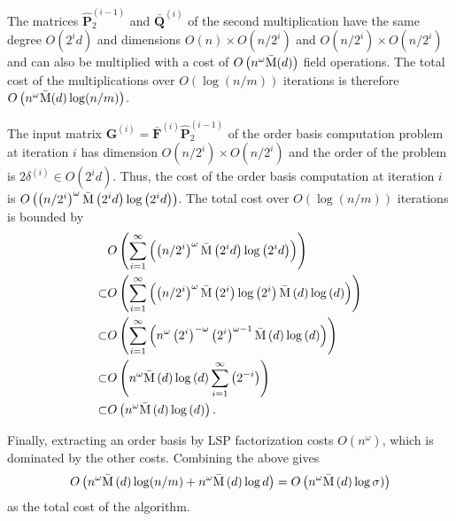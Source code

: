 \begin{pf}
The matrices $\hat{\mathbf{P}}_{2}^{\left(i-1\right)}$ and $\bar{\mathbf{Q}}^{\left(i\right)}$
of the second multiplication have the same degree $O(2^{i}d)$ and
dimensions $O\left(n\right)\times O(n/2^{i})$ and $O(n/2^{i})\times O(n/2^{i})$
and can also be multiplied with a cost of $O\left(n^{\omega}\bar{\M}(d)\right)$
field operations. The total cost of the multiplications over $O(\log\left(n/m\right))$
iterations is therefore $O\left(n^{\omega}\bar{\M}(d)\log(n/m)\right)$.

The input matrix $\mathbf{G}^{\left(i\right)}=\bar{\mathbf{F}}^{\left(i\right)}\hat{\mathbf{P}}_{2}^{\left(i-1\right)}$
of the order basis computation problem at iteration $i$ has dimension
$O(n/2^{i})\times O(n/2^{i})$ and the order of the problem is $2\delta^{\left(i\right)}\in O(2^{i}d)$.
Thus, the cost of the order basis computation at iteration $i$ is
$O\left(\left(n/2^{i}\right)^{\omega}\bar{\M}\left(2^{i}d\right)\log\left(2^{i}d\right)\right)$.
The total cost over $O(\log\left(n/m\right))$ iterations is bounded
by \begin{align*}
 & O\left(\sum_{i=1}^{\infty}\left(\left(n/2^{i}\right)^{\omega}\bar{\M}\left(2^{i}d\right)\log\left(2^{i}d\right)\right)\right)\\
\subset & O\left(\sum_{i=1}^{\infty}\left(\left(n/2^{i}\right)^{\omega}\bar{\M}\left(2^{i}\right)\log\left(2^{i}\right)\bar{\M}\left(d\right)\log\left(d\right)\right)\right)\\
\subset & O\left(\sum_{i=1}^{\infty}\left(n^{\omega}\left(2^{i}\right)^{-\omega}\left(2^{i}\right)^{\omega-1}\bar{\M}\left(d\right)\log\left(d\right)\right)\right)\\
\subset & O\left(n^{\omega}\bar{\M}\left(d\right)\log\left(d\right)\sum_{i=1}^{\infty}\left(2^{-i}\right)\right)\\
\subset & O\left(n^{\omega}\bar{\M}\left(d\right)\log\left(d\right)\right).\end{align*}


Finally, extracting an order basis by LSP factorization costs $O\left(n^{\omega}\right)$,
which is dominated by the other costs. Combining the above gives \[
O\left(n^{\omega}\bar{\M}\left(d\right)\log(n/m)+n^{\omega}\bar{\M}\left(d\right)\log d\right)=O\left(n^{\omega}\bar{\M}\left(d\right)\log\sigma)\right)\]
 as the total cost of the algorithm. 
\end{pf}

